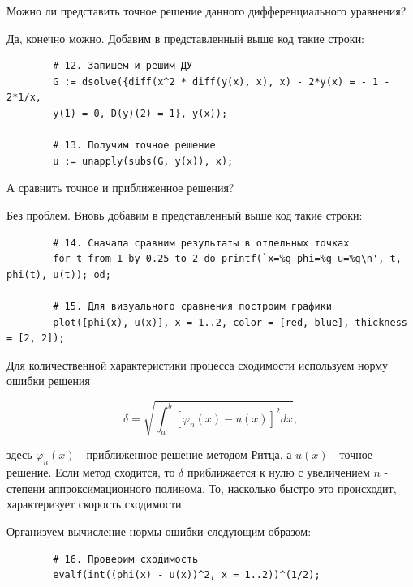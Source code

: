 \documentclass{article}
\begin{document}
\begin{question}
	Можно ли представить точное решение данного дифференциального уравнения?
\end{question}

Да, конечно можно. Добавим в представленный выше код такие строки:

\begin{commandline}
	\begin{verbatim}
		# 12. Запишем и решим ДУ
		G := dsolve({diff(x^2 * diff(y(x), x), x) - 2*y(x) = - 1 - 2*1/x,
		y(1) = 0, D(y)(2) = 1}, y(x));
		
		# 13. Получим точное решение
		u := unapply(subs(G, y(x)), x);
	\end{verbatim}
\end{commandline}

\newpage
\begin{question}
	А сравнить точное и приближенное решения?
\end{question}

Без проблем. Вновь добавим в представленный выше код такие строки:

\begin{commandline}
	\begin{verbatim}
		# 14. Сначала сравним результаты в отдельных точках 
		for t from 1 by 0.25 to 2 do printf(`x=%g phi=%g u=%g\n', t, phi(t), u(t)); od;

		# 15. Для визуального сравнения построим графики
		plot([phi(x), u(x)], x = 1..2, color = [red, blue], thickness = [2, 2]);
	\end{verbatim}
\end{commandline}

Для количественной характеристики процесса сходимости используем норму ошибки решения

\begin{displaymath}
	\delta = \sqrt{ \int_{a}^{b} \left[ \varphi_{n}(x) - u(x) \right]^{2} dx },
\end{displaymath}

\noindent здесь $\varphi_{n}(x)$ - приближенное решение методом Ритца, а $u(x)$ - точное решение. Если метод сходится, то $\delta$ приближается к нулю с увеличением $n$ - степени аппроксимационного полинома. То, насколько быстро это происходит, характеризует скорость сходимости.

Организуем вычисление нормы ошибки следующим образом:

\begin{commandline}
	\begin{verbatim}
		# 16. Проверим сходимость
		evalf(int((phi(x) - u(x))^2, x = 1..2))^(1/2);
	\end{verbatim}
\end{commandline}
\end{document}
